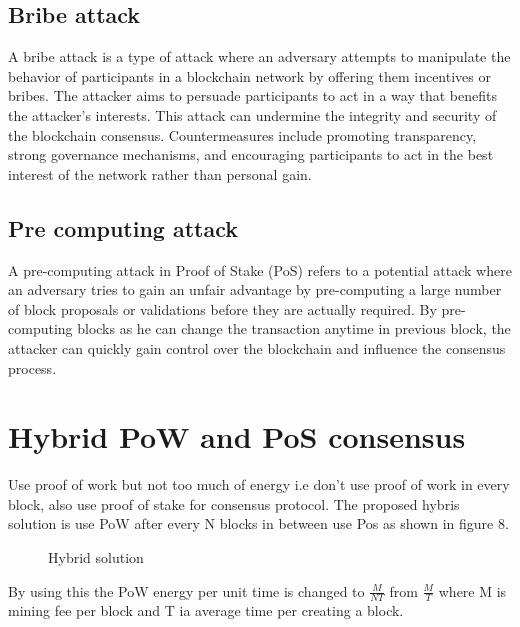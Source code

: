 \documentclass{article}
\begin{document}
\subsection{Bribe attack}
A bribe attack is a type of attack where an adversary attempts to manipulate the behavior of participants in a blockchain network by offering them incentives or bribes. The attacker aims to persuade participants to act in a way that benefits the attacker's interests. This attack can undermine the integrity and security of the blockchain consensus. Countermeasures include promoting transparency, strong governance mechanisms, and encouraging participants to act in the best interest of the network rather than personal gain.
\subsection{Pre computing attack}
A pre-computing attack in Proof of Stake (PoS) refers to a potential attack where an adversary tries to gain an unfair advantage by pre-computing a large number of block proposals or validations before they are actually required. By pre-computing blocks as he can change the transaction anytime in previous block, the attacker can quickly gain control over the blockchain and influence the consensus process.
\section{Hybrid PoW and PoS consensus}
Use proof of work but not too much of energy i.e don't use proof of work in every block, also use proof of stake for consensus protocol.
The proposed hybris solution is use PoW after every N blocks in between use Pos as shown in figure 8. \\
\begin{figure}
\centering
  \caption{Hybrid solution}
\end{figure}
By using this the PoW energy per unit time is changed to $\frac{M}{NT}$ from $\frac{M}{T}$ where M is mining fee per block and T ia average time per creating a block.
\end{document}
